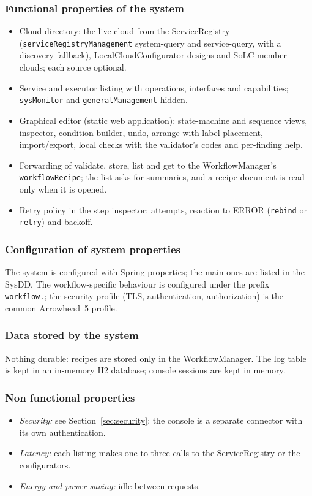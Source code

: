 \documentclass[a4paper]{arrowhead}
\begin{document}
\subsubsection{Functional properties of the system}
\begin{itemize}
\item Cloud directory: the live cloud from the ServiceRegistry (\texttt{service\allowbreak{}Registry\allowbreak{}Management} system-query and
service-query, with a discovery fallback), LocalCloudConfigurator designs and SoLC member clouds; each source optional.
\item Service and executor listing with operations, interfaces and capabilities; \texttt{sysMonitor} and
\texttt{general\allowbreak{}Management} hidden.
\item Graphical editor (static web application): state-machine and sequence views, inspector, condition builder,
undo, arrange with label placement, import/export, local checks with the validator's codes and per-finding help.
\item Forwarding of validate, store, list and get to the WorkflowManager's \texttt{workflow\allowbreak{}Recipe}; the list asks for
summaries, and a recipe document is read only when it is opened.
\item Retry policy in the step inspector: attempts, reaction to ERROR (\texttt{rebind} or \texttt{retry}) and backoff.
\end{itemize}

\subsubsection{Configuration of system properties}
The system is configured with Spring properties; the main ones are listed in the SysDD. The workflow-specific behaviour
is configured under the prefix \texttt{workflow.}; the security profile (TLS, authentication, authorization) is the
common Arrowhead~5 profile.

\subsubsection{Data stored by the system}
Nothing durable: recipes are stored only in the WorkflowManager. The log table is kept in an in-memory H2 database;
console sessions are kept in memory.

\subsubsection{Non functional properties}
\begin{itemize}
\item \emph{Security:} see Section~\ref{sec:security}; the console is a separate connector with its own authentication.
\item \emph{Latency:} each listing makes one to three calls to the ServiceRegistry or the configurators.
\item \emph{Energy and power saving:} idle between requests.
\end{itemize}
\end{document}
